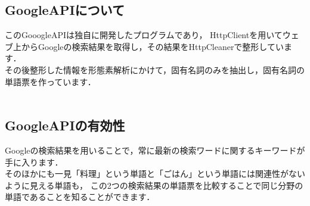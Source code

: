 \subsection{GoogleAPIについて}
このGooogleAPIは独自に開発したプログラムであり，
HttpClientを用いてウェブ上からGoogleの検索結果を取得し，その結果をHttpCleanerで整形しています．\\
その後整形した情報を形態素解析にかけて，固有名詞のみを抽出し，固有名詞の単語票を作っています．\\
\\

\subsection{GoogleAPIの有効性}
Googleの検索結果を用いることで，常に最新の検索ワードに関するキーワードが手に入ります．
\\
そのほかにも一見「料理」という単語と「ごはん」という単語には関連性がないように見える単語も，
この2つの検索結果の単語票を比較することで同じ分野の単語であることを知ることができます．\\